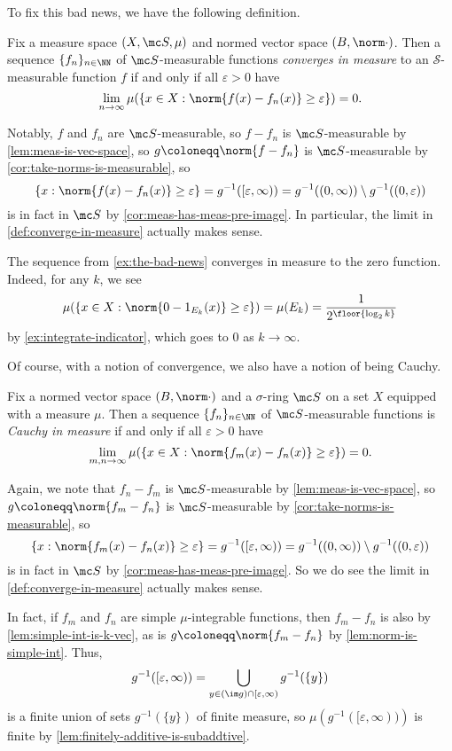\documentclass[../notes.tex]{subfiles}
\begin{document}
To fix this bad news, we have the following definition.
\begin{definition} \label{def:converge-in-measure}
	Fix a measure space $(X,\mc S,\mu)$ and normed vector space $(B,\norm\cdot)$. Then a sequence $\{f_n\}_{n\in\NN}$ of $\mc S$-measurable functions \textit{converges in measure} to an $\mathcal S$-measurable function $f$ if and only if all $\varepsilon>0$ have
	\[\lim_{n\to\infty}\mu(\{x\in X:\norm{f(x)-f_n(x)}\ge\varepsilon\})=0.\]
\end{definition}
\begin{remark}
	Notably, $f$ and $f_n$ are $\mc S$-measurable, so $f-f_n$ is $\mc S$-measurable by \autoref{lem:meas-is-vec-space}, so $g\coloneqq\norm{f-f_n}$ is $\mc S$-measurable by \autoref{cor:take-norms-is-measurable}, so
	\[\{x:\norm{f(x)-f_n(x)}\ge\varepsilon\}=g^{-1}([\varepsilon,\infty))=g^{-1}((0,\infty))\setminus g^{-1}((0,\varepsilon))\]
	is in fact in $\mc S$ by \autoref{cor:meas-has-meas-pre-image}. In particular, the limit in \autoref{def:converge-in-measure} actually makes sense.
\end{remark}
\begin{example} \label{ex:fixing-bad-news}
	The sequence from \autoref{ex:the-bad-news} converges in measure to the zero function. Indeed, for any $k$, we see
	\[\mu(\{x\in X:\norm{0-1_{E_k}(x)}\ge\varepsilon\})=\mu(E_k)=\frac1{2^{\floor{\log_2k}}}\]
	by \autoref{ex:integrate-indicator}, which goes to $0$ as $k\to\infty$.
\end{example}
Of course, with a notion of convergence, we also have a notion of being Cauchy.
\begin{definition}
	Fix a normed vector space $(B,\norm\cdot)$ and a $\sigma$-ring $\mc S$ on a set $X$ equipped with a measure $\mu$. Then a sequence $\{f_n\}_{n\in\NN}$ of $\mc S$-measurable functions is \textit{Cauchy in measure} if and only if all $\varepsilon>0$ have
	\[\lim_{m,n\to\infty}\mu(\{x\in X:\norm{f_m(x)-f_n(x)}\ge\varepsilon\})=0.\]
\end{definition}
\begin{remark} \label{rem:cauchy-in-measure-makes-sense}
	Again, we note that $f_n-f_m$ is $\mc S$-measurable by \autoref{lem:meas-is-vec-space}, so $g\coloneqq\norm{f_m-f_n}$ is $\mc S$-measurable by \autoref{cor:take-norms-is-measurable}, so
	\[\{x:\norm{f_m(x)-f_n(x)}\ge\varepsilon\}=g^{-1}([\varepsilon,\infty))=g^{-1}((0,\infty))\setminus g^{-1}((0,\varepsilon))\]
	is in fact in $\mc S$ by \autoref{cor:meas-has-meas-pre-image}. So we do see the limit in \autoref{def:converge-in-measure} actually makes sense.
\end{remark}
\begin{remark} \label{rem:sets-in-cauchy-in-measure-are-finite}
	In fact, if $f_m$ and $f_n$ are simple $\mu$-integrable functions, then $f_m-f_n$ is also by \autoref{lem:simple-int-is-k-vec}, as is $g\coloneqq\norm{f_m-f_n}$ by \autoref{lem:norm-is-simple-int}. Thus,
	\[g^{-1}([\varepsilon,\infty))=\bigcup_{y\in(\im g)\cap[\varepsilon,\infty)}g^{-1}(\{y\})\]
	is a finite union of sets $g^{-1}(\{y\})$ of finite measure, so $\mu\left(g^{-1}([\varepsilon,\infty))\right)$ is finite by \autoref{lem:finitely-additive-is-subaddtive}.
\end{remark}
\end{document}
